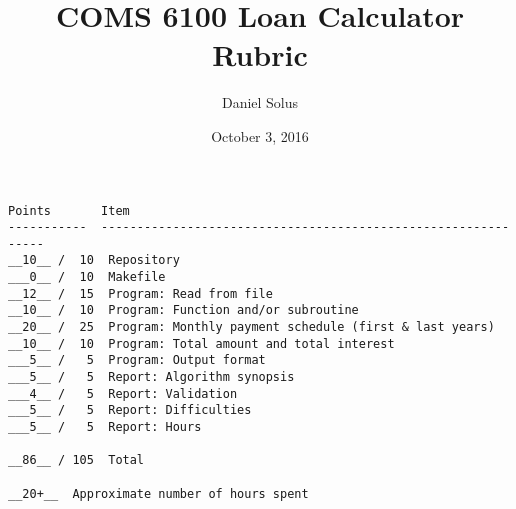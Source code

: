 \documentclass[11pt]{article}
\title{COMS 6100 Loan Calculator Rubric}
\author{Daniel Solus}
\date{October 3, 2016}
\begin{document}
\maketitle

\begin{verbatim}
Points       Item
-----------  --------------------------------------------------------------
__10__ /  10  Repository
___0__ /  10  Makefile
__12__ /  15  Program: Read from file
__10__ /  10  Program: Function and/or subroutine
__20__ /  25  Program: Monthly payment schedule (first & last years)
__10__ /  10  Program: Total amount and total interest
___5__ /   5  Program: Output format
___5__ /   5  Report: Algorithm synopsis
___4__ /   5  Report: Validation
___5__ /   5  Report: Difficulties
___5__ /   5  Report: Hours

__86__ / 105  Total

__20+__  Approximate number of hours spent
\end{verbatim}
\end{document}
